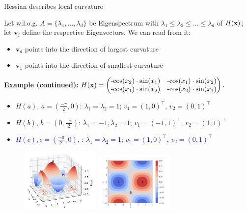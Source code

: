 \begin{vbframe}{Hessian describes local curvature} 

Let w.l.o.g. $A = \{\lambda_1, ..., \lambda_d\}$ be Eigenspectrum with $\lambda_1 \le \lambda_2 \le ... \le \lambda_d$ of $H(\mathbf{x})$; let $\bm{v}_i$ define the respective Eigenvectors. We can read from it: 

\begin{itemize}
  \item $\bm{v}_d$ points into the direction of largest curvature 
  \item $\bm{v}_1$ points into the direction of smallest curvature 
\end{itemize}

\vspace*{0.2cm}

\begin{footnotesize}

\textbf{Example (continued):} $H(\mathbf{x}) = \begin{pmatrix}
\text{-cos}(x_2)\cdot\text{sin}(x_1) & \text{-cos}(x_1)\cdot\text{sin}(x_2) 
\\ \text{-cos}(x_1)\cdot\text{sin}(x_2) & \text{-cos}(x_2)\cdot\text{sin}(x_1) 
\end{pmatrix}.
$

\begin{itemize}
  \item $H(a)$, $a=(\frac{-\pi}{2},0)$: $\lambda_1 = \lambda_2 = 1$; $v_1 = (1, 0)^\top$, $v_2 = (0, 1)^\top$
  \item $H(b)$, $b=(0,\frac{-\pi}{2})$: $\lambda_1 = -1, \lambda_2 = 1$; $v_1 = (-1, 1)^\top$, $v_2 = (1, 1)^\top$
  \item \textcolor{blue}{$H(c), c=(\frac{-\pi}{2},0)$, : $\lambda_1 = \lambda_2 = 1$; $v_1 = (1, 0)^\top$, $v_2 = (0, 1)^\top$}
\end{itemize}

\end{footnotesize}

\vspace*{-0.5cm}

\begin{figure}[!tbp]
    \includegraphics[width=0.35\textwidth]{figure_man/hessian_3d.png}
    \includegraphics[width=0.35\textwidth]{figure_man/hessian_contour.png}
\end{figure} 

\end{vbframe}
\framebreak 

